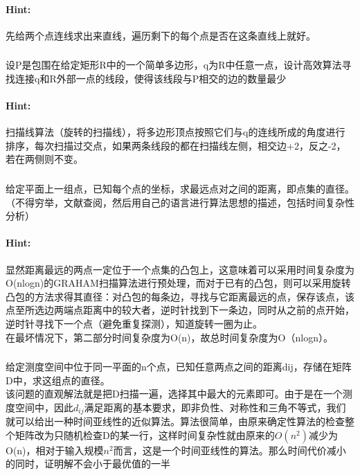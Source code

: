 \documentclass{article}
\begin{document}
     \paragraph{Hint:}先给两个点连线求出来直线，遍历剩下的每个点是否在这条直线上就好。
     
     \subsubsection{}设P是包围在给定矩形R中的一个简单多边形，q为R中任意一点，设计高效算法寻找连接q和R外部一点的线段，使得该线段与P相交的边的数量最少
     \paragraph{Hint:}扫描线算法（旋转的扫描线），将多边形顶点按照它们与q的连线所成的角度进行排序，每次扫描过交点，如果两条线段的都在扫描线左侧，相交边+2，反之-2，若在两侧则不变。
     
     \subsubsection{}给定平面上一组点，已知每个点的坐标，求最远点对之间的距离，即点集的直径。（不得穷举，文献查阅，然后用自己的语言进行算法思想的描述，包括时间复杂性分析）
     \paragraph{Hint:}显然距离最远的两点一定位于一个点集的凸包上，这意味着可以采用时间复杂度为O(nlogn)的GRAHAM扫描算法进行预处理，而对于已有的凸包，则可以采用旋转凸包的方法求得其直径：对凸包的每条边，寻找与它距离最远的点，保存该点，该点至所选边两端点距离中的较大者，逆时针找到下一条边，同时从之前的点开始，逆时针寻找下一个点（避免重复探测），知道旋转一圈为止。\\
在最坏情况下，第二部分时间复杂度为O(n)，故总时间复杂度为O（nlogn）。
     
     \subsubsection{}给定测度空间中位于同一平面的n个点，已知任意两点之间的距离dij，存储在矩阵D中，求这组点的直径。\\
该问题的直观解法就是把D扫描一遍，选择其中最大的元素即可。由于是在一个测度空间中，因此$d_{ij}$满足距离的基本要求，即非负性、对称性和三角不等式，我们就可以给出一种时间亚线性的近似算法。算法很简单，由原来确定性算法的检查整个矩阵改为只随机检查D的某一行，这样时间复杂性就由原来的$O(n^2)$减少为O(n)，相对于输入规模$n^2$而言，这是一个时间亚线性的算法。那么时间代价减小的同时，证明解不会小于最优值的一半
\end{document}
